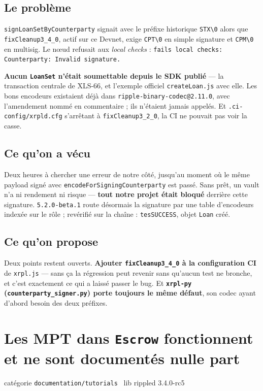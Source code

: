 \documentclass[10pt,a4paper]{article}
\newcommand{\cat}[2]{{\small\textsf{catégorie} \texttt{#1} \textperiodcentered\ \textsf{lib} #2}\par\vspace{2pt}}
\newcommand{\tc}[1]{\texttt{#1}}
\begin{document}
\subsection{Le problème}
\tc{signLoanSetByCounterparty} signait avec le préfixe historique \tc{STX\textbackslash0} alors
que \tc{fixCleanup3\_4\_0}, actif sur ce Devnet, exige \tc{CPT\textbackslash0} en simple
signature et \tc{CPM\textbackslash0} en multisig. Le n\oe{}ud refusait aux \emph{local checks} :
\tc{fails local checks: Counterparty: Invalid signature.}

\textbf{Aucun \tc{LoanSet} n'était soumettable depuis le SDK publié} --- la transaction centrale
de XLS-66, et l'exemple officiel \tc{createLoan.js} avec elle. Les bons encodeurs existaient
déjà dans \tc{ripple-binary-codec@2.11.0}, avec l'amendement nommé en commentaire ; ils
n'étaient jamais appelés. Et \tc{.ci-config/xrpld.cfg} s'arrêtant à \tc{fixCleanup3\_2\_0}, la
CI ne pouvait pas voir la casse.

\subsection{Ce qu'on a vécu}
Deux heures à chercher une erreur de notre côté, jusqu'au moment où le même payload signé avec
\tc{encodeForSigningCounterparty} est passé. Sans prêt, un vault n'a ni rendement ni risque ---
\textbf{tout notre projet était bloqué} derrière cette signature. \tc{5.2.0-beta.1} route
désormais la signature par une table d'encodeurs indexée sur le rôle ; revérifié sur la chaîne :
\tc{tesSUCCESS}, objet \tc{Loan} créé.

\subsection{Ce qu'on propose}
Deux points restent ouverts. \textbf{Ajouter \tc{fixCleanup3\_4\_0} à la configuration CI} de
\tc{xrpl.js} --- sans ça la régression peut revenir sans qu'aucun test ne bronche, et c'est
exactement ce qui a laissé passer le bug. Et \textbf{\tc{xrpl-py} (\tc{counterparty\_signer.py})
porte toujours le même défaut}, son codec ayant d'abord besoin des deux préfixes.

\section{Les MPT dans \texttt{Escrow} fonctionnent et ne sont documentés nulle part}
\cat{documentation/tutorials}{rippled 3.4.0-rc5}
\end{document}
